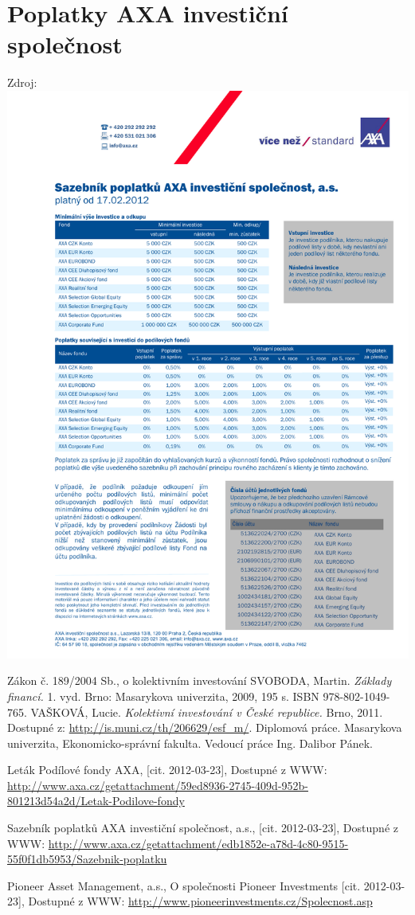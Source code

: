 \documentclass[a4paper,12pt]{article}
\begin{document}
\section{Poplatky AXA investiční společnost}
\label{axa}	
Zdroj:  \cite{axa_cite}\\
\includegraphics[width=1.0\textwidth]{axa.pdf}
\renewcommand{\bibname}{Seznam použité literatury}
\begin{thebibliography}{9}
\thispagestyle{plain}
 Zákon č. 189/2004 Sb., o kolektivním investování
 SVOBODA, Martin. \emph{Základy financí.} 1. vyd. Brno: Masarykova univerzita, 2009, 195 s. ISBN 978-802-1049-765. 
 VAŠKOVÁ, Lucie. \emph{Kolektivní investování v České republice.} Brno, 2011. Dostupné z: \url{http://is.muni.cz/th/206629/esf_m/}. Diplomová práce. Masarykova univerzita, Ekonomicko-správní fakulta. Vedoucí práce Ing. Dalibor Pánek.

Leták Podílové fondy AXA, [cit. 2012-03-23], Dostupné z WWW:  \url{http://www.axa.cz/getattachment/59ed8936-2745-409d-952b-801213d54a2d/Letak-Podilove-fondy}


Sazebník poplatků AXA investiční společnost, a.s., [cit. 2012-03-23], Dostupné z WWW:  \url{http://www.axa.cz/getattachment/edb1852e-a78d-4c80-9515-55f0f1db5953/Sazebnik-poplatku}

Pioneer Asset Management, a.s., O společnosti Pioneer Investments [cit. 2012-03-23], Dostupné z WWW:  \url{http://www.pioneerinvestments.cz/Spolecnost.asp}
\end{thebibliography}
\end{document}
